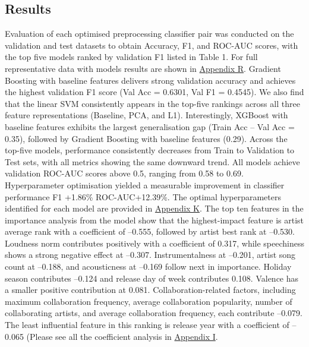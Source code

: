 \documentclass{article}
\begin{document}
{{{\subsection{Results}
Evaluation of each optimised preprocessing classifier pair was conducted on the validation and test datasets to obtain Accuracy, F1, and ROC-AUC scores, with the top five models ranked by validation F1 listed in Table 1. For full representative data with models results are shown in 
\hyperref[fig:resultallrepresentation]{Appendix R}. Gradient Boosting with baseline features delivers strong validation accuracy and achieves the highest validation F1 score (Val Acc = 0.6301, Val F1 = 0.4545). We also find that the linear SVM consistently appears in the top-five rankings across all three feature representations (Baseline, PCA, and L1). Interestingly, XGBoost with baseline features exhibits the largest generalisation gap (Train Acc – Val Acc = 0.35), followed by Gradient Boosting with baseline features (0.29). Across the top-five models, performance consistently decreases from Train to Validation to Test sets, with all metrics showing the same downward trend. All models achieve validation ROC-AUC scores above 0.5, ranging from 0.58 to 0.69. Hyperparameter optimisation yielded a measurable improvement in classifier performance F1 +1.86\% ROC-AUC+12.39\%. The optimal hyperparameters identified for each model are provided in \hyperref[fig:Optimal_Hyper_parameter]{Appendix K}. 
The top ten features in the importance analysis from the model show that the highest-impact feature is artist average rank with a coefficient of –0.555, followed by artist best rank at –0.530. Loudness norm contributes positively with a coefficient of 0.317, while speechiness shows a strong negative effect at –0.307. Instrumentalness at –0.201, artist song count at –0.188, and acousticness at –0.169 follow next in importance. Holiday season contributes –0.124 and release day of week contributes 0.108. Valence has a smaller positive contribution at 0.081. Collaboration-related factors, including maximum collaboration frequency, average collaboration popularity, number of collaborating artists, and average collaboration frequency, each contribute –0.079. The least influential feature in this ranking is release year with a coefficient of –0.065 (Please see all the coefficient analysis in \hyperref[fig:Feature Importance]{Appendix I}.
\begin{table}[h!]
\centering
\caption{Complete Performance Metrics}

\end{table}}}}
\end{document}
